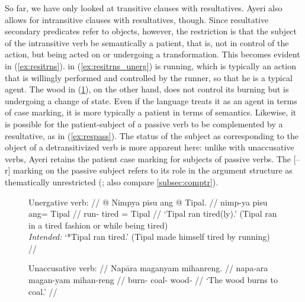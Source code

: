 So far, we have only looked at transitive clauses with resultatives. Ayeri also
allows for intransitive clauses with resultatives, though. Since resultative
secondary predicates refer to objects, however, the restriction is that the
subject of the intransitive verb be semantically a patient, that is, not in
control of the action, but being acted on or undergoing a transformation. This
becomes evident in (\ref{ex:resitrns}).  in 
(\ref{ex:resitrns_unerg}) is running, which is typically an action that is
willingly performed and controlled by the runner, so that he is a typical
agent. The wood in (\ref{ex:resitrns_unacc}), on the other hand, does not
control its burning but is undergoing a change of state. Even if the language
treats it as an agent in terms of case marking, it is more typically a patient
in terms of semantics. Likewise, it is possible for the patient-subject of a
passive verb to be complemented by a resultative, as in (\ref{ex:respass}). The
status of the subject as corresponding to the object of a detransitivized verb
is more apparent here: unlike with unaccusative verbs, Ayeri retains the
patient case marking for subjects of passive verbs. The [–\,r] marking on the
passive subject refers to its role in the argument structure as thematically
unrestricted (\cite[324--348]{bresnan2016}; also compare \autoref{subsec:comptr}).

\begin{figure}
\pex\label{ex:resitrns}
\a\label{ex:resitrns_unerg}\begingl
	\glpreamble Unergative verb: //
	\gla \upshape{\excl{}} @ Nimpya pisu ang @ Tipal. //
	\glb {} nimp-ya pisu ang= Tipal //
	\glc {} run-\TsgM{} tired \Aarg{}= Tipal //
	\glft \hphantom{\excl}`Tipal ran tired(ly).' (Tipal ran in a tired fashion 
		or while being tired) \\
		\hphantom{\excl}\textit{Intended:} `*Tipal ran tired.' (Tipal made
		himself tired by running) //
\endgl

\a\label{ex:resitrns_unacc}\begingl
	\glpreamble Unaccusative verb: //
	\gla Napāra maganyam mihanreng. //
	\glb napa-ara magan-yam mihan-reng //
	\glc burn-\TsgI{} coal-\Dat{} wood-\AargI{} //
	\glft `The wood burns to coal.' //
\endgl

\xe
\end{figure}

